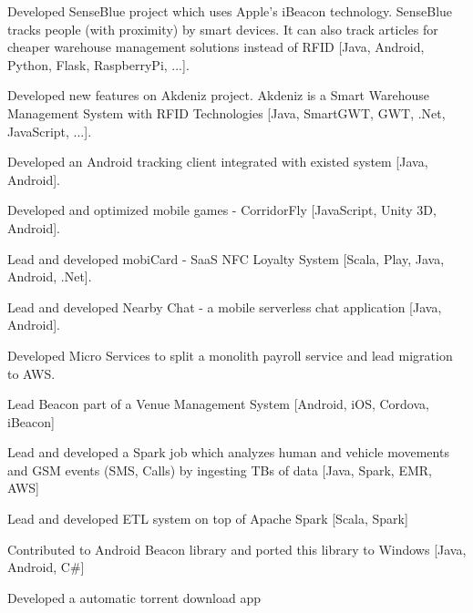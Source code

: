 \documentclass[]{furkanvarol-resume}
\begin{document}
\begin{minipage}[t]{0.66\textwidth}
\begin{tightemize}
\item Developed SenseBlue project which uses Apple's iBeacon technology.
SenseBlue tracks people (with proximity) by smart devices.
It can also track articles for cheaper warehouse management solutions instead of RFID [Java, Android, Python, Flask, RaspberryPi, ...].
\item Developed new features on Akdeniz project.
Akdeniz is a Smart Warehouse Management System with RFID Technologies [Java, SmartGWT, GWT, .Net, JavaScript, ...].
\end{tightemize}
\sectionsep

\descript{}
\begin{tightemize}
\item Developed an Android tracking client integrated with existed system [Java, Android].
\item Developed and optimized mobile games - CorridorFly [JavaScript, Unity 3D, Android].
\item Lead and developed mobiCard - SaaS NFC Loyalty System [Scala, Play, Java, Android, .Net].
\item Lead and developed Nearby Chat - a mobile serverless chat application [Java, Android].
\end{tightemize}
\sectionsep


\descript{}
\begin{tightemize}
\item Developed Micro Services to split a monolith payroll service and lead migration to AWS.
\item Lead Beacon part of a Venue Management System [Android, iOS, Cordova, iBeacon]
\item Lead and developed a Spark job which analyzes human and vehicle movements and GSM events (SMS, Calls) by ingesting TBs of data [Java, Spark, EMR, AWS]
\end{tightemize}
\sectionsep


\descript{}
\begin{tightemize}
\item Lead and developed ETL system on top of Apache Spark [Scala, Spark]
\item Contributed to Android Beacon library and ported this library to Windows [Java, Android, C\#]
\item Developed a automatic torrent download app
\end{tightemize}
\sectionsep


\end{minipage}
\end{document}
